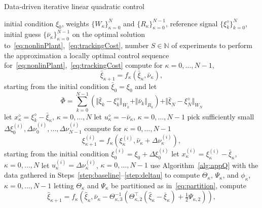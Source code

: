 \documentclass[10pt]{IEEEtran}      %
\newcommand{\N}{\mathbb{N}}
\theoremstyle{theorem}
\theoremstyle{remark}
\begin{document}
\begin{algorithm}[htb!]
\caption{Data-driven iterative linear quadratic control\label{alg:iLQR}}
\begin{algorithmic}[1]
\REQUIRE initial condition $\xi_0$,
weights $\{W_\kappa\}_{\kappa=0}^{N}$ and $\{R_\kappa\}_{\kappa=0}^{N-1}$, 
reference signal $\{\xi_k^\diamond\}_{k=0}^N$,
initial guess $\{\bar{\nu}_\kappa\}_{\kappa=0}^{N-1}$ on the optimal solution to~\eqref{eq:nonlinPlant},~\eqref{eq:trackingCost},
number $S\in\N$ of experiments to perform the approximation
\ENSURE a locally optimal control sequence for~\eqref{eq:nonlinPlant},~\eqref{eq:trackingCost} 
\REPEAT
\STATE \label{step:baseline}compute for $\kappa=0,\dots,N-1$, 
	\begin{equation*}
	\bar{\xi}_{\kappa+1}=f_\kappa(\bar{\xi}_{\kappa},\bar{\nu}_{\kappa}),
	\end{equation*}
	starting from the initial condition $\bar{\xi}_0=\xi_0$ and let 
	\begin{equation*}
	\bar{\Phi}=\sum_{k=0}^{N-1}(\Vert \bar{\xi}_{k}-\xi_k^\diamond\Vert_{W_k}+\Vert \bar{\nu}_k \Vert_{R_k})+\Vert \bar{\xi}_{N}-\xi_N^\diamond\Vert_{W_N}
	\end{equation*}
	\STATE let $x_\kappa^\diamond = \xi_k^\diamond-\bar{\xi}_\kappa$, $\kappa=0,\dots,N$
	\STATE let $u_\kappa^\diamond = -\bar{\nu}_\kappa$, $\kappa=0,\dots,N-1$
		\STATE pick sufficiently small $\Delta \xi_0^{(i)},\Delta \nu_0^{(i)},\dots,\Delta \nu_{N-1}^{(i)}$
		\STATE \label{step:randSamp}compute for $\kappa=0,\dots,N-1$
		\begin{equation*}
		\xi_{\kappa+1}^{(i)}=f_\kappa({\xi}_{\kappa}^{(i)},\bar{\nu}_{\kappa}+\Delta \nu_{\kappa}^{(i)}),
		\end{equation*}
		starting from the initial condition ${\xi}_0^{(i)}=\xi_0+\Delta \xi_0^{(i)}$
		\STATE let $x_\kappa^{(i)}=\xi_{\kappa}^{(i)}-\bar{\xi}_{\kappa}$, $\kappa=0,\dots,N$
		\STATE \label{step:deltau}let $u_\kappa^{(i)}=\Delta \nu_\kappa^{(i)}$, $\kappa=0,\dots,N-1$ 
	\ENDFOR
	\STATE use Algorithm~\ref{alg:appQ} with the data gathered in Steps~\ref{step:baseline}--\ref{step:deltau} to compute $\Theta_{\kappa}$, $\Psi_{\kappa}$, and $\phi_{\kappa}$, $\kappa=0,\dots,N-1$\label{step:appr}
	\STATE \label{step:improved}letting $\Theta_{\kappa}$ and $\Psi_{\kappa}$ be partitioned as in~\eqref{eq:partition}, compute 
		\begin{equation*}
		\hat{\xi}_{\kappa+1}=f_\kappa\left(\hat{\xi}_{\kappa},\bar{\nu}_{\kappa}-\Theta_{\kappa,3}^{-1}\left(\Theta_{\kappa,2}^\top (\hat{\xi}_{\kappa}-\bar{\xi}_{\kappa})+\tfrac{1}{2}\Psi_{\kappa,2}\right)\right),

\end{equation*}
\end{algorithmic}
\end{algorithm}
\end{document}
